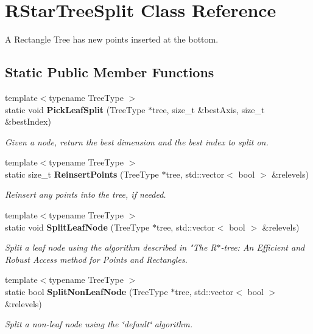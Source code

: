 \section{R\+Star\+Tree\+Split Class Reference}
\label{classmlpack_1_1tree_1_1RStarTreeSplit}


A Rectangle Tree has new points inserted at the bottom.  


\subsection*{Static Public Member Functions}
\begin{DoxyCompactItemize}
\item 
{\footnotesize template$<$typename Tree\+Type $>$ }\\static void \textbf{ Pick\+Leaf\+Split} (Tree\+Type $\ast$tree, size\+\_\+t \&best\+Axis, size\+\_\+t \&best\+Index)
\begin{DoxyCompactList}\small\item\em Given a node, return the best dimension and the best index to split on. \end{DoxyCompactList}\item 
{\footnotesize template$<$typename Tree\+Type $>$ }\\static size\+\_\+t \textbf{ Reinsert\+Points} (Tree\+Type $\ast$tree, std\+::vector$<$ bool $>$ \&relevels)
\begin{DoxyCompactList}\small\item\em Reinsert any points into the tree, if needed. \end{DoxyCompactList}\item 
{\footnotesize template$<$typename Tree\+Type $>$ }\\static void \textbf{ Split\+Leaf\+Node} (Tree\+Type $\ast$tree, std\+::vector$<$ bool $>$ \&relevels)
\begin{DoxyCompactList}\small\item\em Split a leaf node using the algorithm described in "The R$\ast$-\/tree\+: An Efficient and Robust Access method for Points and Rectangles. \end{DoxyCompactList}\item 
{\footnotesize template$<$typename Tree\+Type $>$ }\\static bool \textbf{ Split\+Non\+Leaf\+Node} (Tree\+Type $\ast$tree, std\+::vector$<$ bool $>$ \&relevels)
\begin{DoxyCompactList}\small\item\em Split a non-\/leaf node using the \char`\"{}default\char`\"{} algorithm. \end{DoxyCompactList}\end{DoxyCompactItemize}



